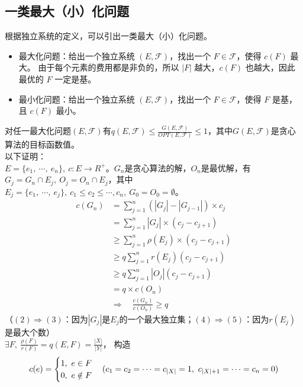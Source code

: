 \subsection{一类最大（小）化问题}
根据独立系统的定义，可以引出一类最大（小）化问题。
\begin{itemize}
    \item 最大化问题：给出一个独立系统 $(E, \mathcal{F})$，找出一个 $F \in \mathcal{F}$，使得 $c(F)$ 最大。
    由于每个元素的费用都是非负的，所以 $|F|$ 越大，$c(F)$ 也越大，因此最优的 $F$ 一定是基。
    \item 最小化问题：给出一个独立系统 $(E, \mathcal{F})$，找出一个 $F \in \mathcal{F}$，使得 $F$ 是基，且 $c(F)$ 最小。
\end{itemize}
对任一最大化问题$(E, \mathcal{F})$有$q(E, \mathcal{F}) \le \frac{G(E, \mathcal{F})}{OPT(E, \mathcal{F})} \le 1$，其中$G(E, \mathcal{F})$是贪心算法的目标函数值。 \\
以下证明： \\
$E = \{e_1, \ \cdots, \ e_n\}, \ c: E \rightarrow R^+$。$G_n$是贪心算法的解，$O_n$是最优解，有$G_j = G_n \cap E_j, \ O_j = O_n \cap E_j$，其中$E_j = \{e_1, \ \cdots, \ e_j\}, \ c_1 \le c_2 \le \cdots, c_n, \ G_0 = O_0 = \emptyset$。
\begin{align}
    c(G_n) & = \sum^{n}_{j = 1}(|G_j| - |G_{j - 1}|) \times c_j \tag{1} \\ 
    & = \sum^{n}_{j = 1}|G_j| \times (c_j - c_{j + 1}) \tag{2} \\
    & \ge \sum^{n}_{j = 1}\rho(E_j) \times (c_j - c_{j + 1}) \tag{3} \\ 
    & \ge q\sum^{n}_{j = 1}r(E_j)(c_j - c_{j + 1}) \tag{4} \\
    & \ge q\sum^{n}_{j = 1}|O_j|(c_j - c_{j + 1}) \tag{5} \\ 
    & = q \times c(O_n) \tag{6} \\
    & \Rightarrow \quad \frac{c(G_n)}{c(O_n)} \ge q \tag{7}
\end{align}
（$(2) \Rightarrow (3)$：因为$|G_j|$是$E_j$的一个最大独立集；$(4) \Rightarrow (5)$：因为$r(E_j)$是最大个数） \\
$\exists F, \ \frac{\rho(F)}{r(F)} = q(E, F) = \frac{|X|}{|Y|}$， 构造
$$
c(e) = 
\begin{cases}
1, \ e \in F \\
0, \ e \notin F
\end{cases} \\
(c_1 = c_2 = \cdots = c_{|X|} = 1, \ c_{|X| + 1} = \cdots = c_n = 0)
$$


